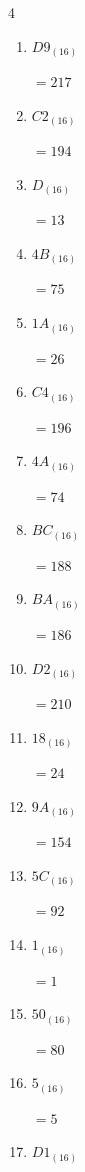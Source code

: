 \begin{multicols}{4}
\begin{enumerate}
  \item $D9_{(16)}$

        $=217$

  \item $C2_{(16)}$

        $=194$

  \item $D_{(16)}$

        $=13$

  \item $4B_{(16)}$

        $=75$

  \item $1A_{(16)}$

        $=26$

  \item $C4_{(16)}$

        $=196$

  \item $4A_{(16)}$

        $=74$

  \item $BC_{(16)}$

        $=188$

  \item $BA_{(16)}$

        $=186$

  \item $D2_{(16)}$

        $=210$

\columnbreak %

  \item $18_{(16)}$

        $=24$

  \item $9A_{(16)}$

        $=154$

  \item $5C_{(16)}$

        $=92$

  \item $1_{(16)}$

        $=1$

  \item $50_{(16)}$

        $=80$

  \item $5_{(16)}$

        $=5$

  \item $D1_{(16)}$


\end{enumerate}
\end{multicols}
